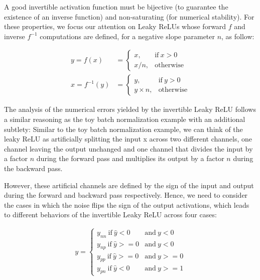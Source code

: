 \documentclass[twocolumn]{bmcart}
\begin{document}
A good invertible activation function must be bijective (to guarantee the existence of an inverse function) and non-saturating (for numerical stability).
For these properties, we focus our attention on Leaky ReLUs whose forward $f$ and inverse $f^{-1}$ computations are defined, for a negative slope parameter $n$, as follow:

\begin{subequations}
\begin{align}
y = f(x) &=      \begin{cases}
x, & \text{if}\ x>0 \\
x / n, & \text{otherwise}
\end{cases} \\
x = f^{-1}(y) &= \begin{cases}
y, & \text{if}\ y>0 \\
y \times n, & \text{otherwise}
\end{cases} 
\end{align}
\end{subequations}

The analysis of the numerical errors yielded by the invertible Leaky ReLU follows a similar reasoning as the toy batch normalization example with an additional subtlety:
Similar to the toy batch normalization example, we can think of the leaky ReLU as artificially splitting the input x across two different channels, 
one channel leaving the output unchanged and one channel that divides the input by a factor $n$ during the forward pass and multiplies its output by a factor $n$ during the backward pass.

However, these artificial channels are defined by the sign of the input and output during the forward and backward pass respectively.
Hence, we need to consider the cases in which the noise flips the sign of the output activations, 
which leads to different behaviors of the invertible Leaky ReLU across four cases: 

\begin{subequations}
\begin{align}
y = \begin{cases}
y_{nn} \  \text{if}\  \hat{y}<0    &\text{and}\  y<0  \\
y_{np} \  \text{if}\  \hat{y}>=0   &\text{and}\  y<0  \\
y_{pp} \  \text{if}\  \hat{y}>=0   &\text{and}\  y>=0 \\
y_{pn} \  \text{if}\  \hat{y}<0    &\text{and}\  y>=1 
\end{cases} 
\end{align}
\end{subequations}
\end{document}

